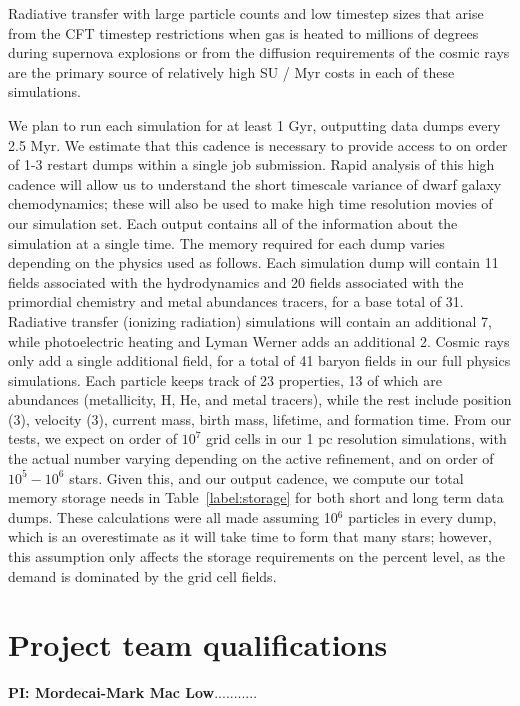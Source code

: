 \documentclass[11pt]{article}
\begin{document}
Radiative transfer with large particle counts and low timestep sizes that arise from the CFT timestep restrictions when gas is heated to millions of degrees during supernova explosions or from the diffusion requirements of the cosmic rays are the primary source of relatively high SU / Myr costs in each of these simulations.

We plan to run each simulation for at least 1 Gyr, outputting data dumps every 2.5 Myr. We estimate that this cadence is necessary to provide access to on order of 1-3 restart dumps within a single job submission. Rapid analysis of this high cadence will allow us to understand the short timescale variance of dwarf galaxy chemodynamics; these will also be used to make high time resolution movies of our simulation set. Each output contains all of the information about the simulation at a single time. The memory required for each dump varies depending on the physics used as follows. Each simulation dump will contain 11 fields associated with the hydrodynamics and 20 fields associated with the primordial chemistry and metal abundances tracers, for a base total of 31. Radiative transfer (ionizing radiation) simulations will contain an additional 7, while photoelectric heating and Lyman Werner adds an additional 2. Cosmic rays only add a single additional field, for a total of 41 baryon fields in our full physics simulations. Each particle keeps track of 23 properties, 13 of which are abundances (metallicity, H, He, and metal tracers), while the rest include position (3), velocity (3), current mass, birth mass, lifetime, and formation time. From our tests, we expect on order of $10^{7}$ grid cells in our 1 pc resolution simulations, with the actual number varying depending on the active refinement, and on order of $10^{5} - 10^{6}$ stars. Given this, and our output cadence, we compute our total memory storage needs in Table~\ref{label:storage} for both short and long term data dumps. These calculations were all made assuming 10$^{6}$ particles in every dump, which is an overestimate as it will take time to form that many stars; however, this assumption only affects the storage requirements on the percent level, as the demand is dominated by the grid cell fields.



\section{Project team qualifications}

\textbf{PI: Mordecai-Mark Mac Low}...........
\end{document}
